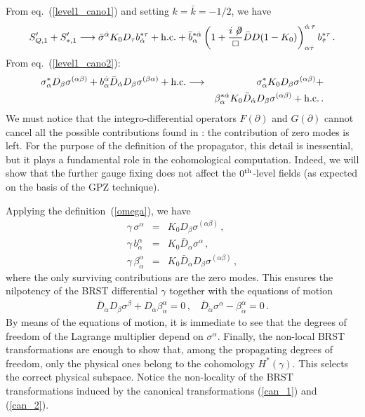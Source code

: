 \documentclass[a4paper,12pt]{article}
\begin{document}
From eq.~(\ref{level1_cano1}) and setting $k = \bar k = -1/2$, we have 
\begin{eqnarray}
  \label{level1_fin1}
  S'_{Q,1} + S'_{*,1} \longrightarrow 
  \bar \sigma^{\dot \alpha} K_0 D_\tau b^{*\tau}_{\dot \alpha} + {\rm
  h.c.} +   
 \bar b^{*\dot \alpha}_{\alpha} 
\left(  1 + \frac{i\not\!{\partial}}{\Box} \bar D D   (1 - K_0) 
\right)^{\dot  \alpha \, \tau}_{\alpha \dot  \tau} b^{*\tau}_{\dot
  \tau}\, . 
\end{eqnarray}
From eq.~(\ref{level1_cano2}):
\begin{eqnarray}
  \label{level1_fin2}
\sigma_{\alpha}^* D_\beta \sigma^{(\alpha \beta)} +  b_\alpha^{\dot \alpha}
\bar D_{\dot \alpha} D_\beta
 \sigma^{(\beta\alpha)} + {\rm h.c.} \longrightarrow 
&& \sigma_{\alpha}^*  K_0 D_\beta \sigma^{(\alpha \beta)} + \nonumber \\
&& \beta_\alpha^{*\dot \alpha} K_0 \bar D_{\dot \alpha} D_\beta
\sigma^{(\alpha \beta)}  
+ {\rm h.c.}\,.
\end{eqnarray}
We must notice that the integro-differential operators
$F(\partial)$ and $G(\partial)$ cannot cancel all the
possible contributions found in \cite{GPZ}: the contribution
of zero modes is left. For the purpose of the definition of the
propagator, this detail is inessential, but it plays a fundamental role
in the cohomological computation. Indeed, we will show that the
further gauge fixing does not affect the $0^{\rm th}$-level fields (as
expected on the basis of the GPZ technique).

Applying the definition~(\ref{omega}), we have
\begin{eqnarray}
  \label{BRST_non-loc}
  \gamma \, \sigma^\alpha &=& K_0 D_\beta \sigma^{(\alpha \beta)}\,,
  \nonumber \\ 
  \gamma \, b^{\alpha}_{\dot \alpha} &=&  K_0 \bar D_{\dot \alpha}
  \sigma^{\alpha}\,, \\ 
  \gamma \, \beta^{\alpha}_{\dot \alpha} &=& K_0 \bar D_{\dot \alpha}
D_\beta \sigma^{(\alpha \beta)} \,, \nonumber 
 \end{eqnarray}
where the only surviving contributions are the zero modes. This
ensures the nilpotency of the BRST differential $\gamma$ together
with the equations of motion
\begin{eqnarray}
  \label{eq_mo}
  \bar D_{\dot \alpha} D_\beta \sigma^{\beta} +  D_\alpha
  \beta^{\alpha}_{\dot \alpha} = 0\,, ~~~~ 
\bar D_{\dot \alpha} \sigma^{\alpha}  - \beta^{\alpha}_{\dot \alpha} = 0\,. 
\end{eqnarray}
By means of the equations of motion, it is immediate to see that the
degrees of freedom of the Lagrange multiplier depend on
$\sigma^\alpha$. Finally, the non-local BRST transformations are 
enough to show that, among the propagating degrees of freedom, only the
physical ones belong to the cohomology $H^*(\gamma)$. This selects the
correct physical subspace. Notice the non-locality of the BRST
transformations induced by the canonical transformations
(\ref{can_1}) and (\ref{can_2}).
\end{document}
